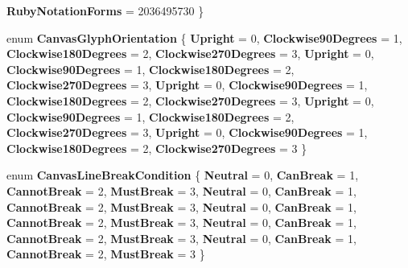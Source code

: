 \begin{DoxyCompactItemize}
{\bfseries Ruby\+Notation\+Forms} = 2036495730
 \}
\item 
\mbox{\label{namespace_microsoft_1_1_graphics_1_1_canvas_1_1_text_a6d01f61e95bc019eb180ac64876b87fe}} 
enum {\bfseries Canvas\+Glyph\+Orientation} \{ \newline
{\bfseries Upright} = 0, 
{\bfseries Clockwise90\+Degrees} = 1, 
{\bfseries Clockwise180\+Degrees} = 2, 
{\bfseries Clockwise270\+Degrees} = 3, 
\newline
{\bfseries Upright} = 0, 
{\bfseries Clockwise90\+Degrees} = 1, 
{\bfseries Clockwise180\+Degrees} = 2, 
{\bfseries Clockwise270\+Degrees} = 3, 
\newline
{\bfseries Upright} = 0, 
{\bfseries Clockwise90\+Degrees} = 1, 
{\bfseries Clockwise180\+Degrees} = 2, 
{\bfseries Clockwise270\+Degrees} = 3, 
\newline
{\bfseries Upright} = 0, 
{\bfseries Clockwise90\+Degrees} = 1, 
{\bfseries Clockwise180\+Degrees} = 2, 
{\bfseries Clockwise270\+Degrees} = 3, 
\newline
{\bfseries Upright} = 0, 
{\bfseries Clockwise90\+Degrees} = 1, 
{\bfseries Clockwise180\+Degrees} = 2, 
{\bfseries Clockwise270\+Degrees} = 3
 \}
\item 
\mbox{\label{namespace_microsoft_1_1_graphics_1_1_canvas_1_1_text_a8700477798bba01933c71dbfcf9029cd}} 
enum {\bfseries Canvas\+Line\+Break\+Condition} \{ \newline
{\bfseries Neutral} = 0, 
{\bfseries Can\+Break} = 1, 
{\bfseries Cannot\+Break} = 2, 
{\bfseries Must\+Break} = 3, 
\newline
{\bfseries Neutral} = 0, 
{\bfseries Can\+Break} = 1, 
{\bfseries Cannot\+Break} = 2, 
{\bfseries Must\+Break} = 3, 
\newline
{\bfseries Neutral} = 0, 
{\bfseries Can\+Break} = 1, 
{\bfseries Cannot\+Break} = 2, 
{\bfseries Must\+Break} = 3, 
\newline
{\bfseries Neutral} = 0, 
{\bfseries Can\+Break} = 1, 
{\bfseries Cannot\+Break} = 2, 
{\bfseries Must\+Break} = 3, 
\newline
{\bfseries Neutral} = 0, 
{\bfseries Can\+Break} = 1, 
{\bfseries Cannot\+Break} = 2, 
{\bfseries Must\+Break} = 3
 \}
\item 
\mbox{\label{namespace_microsoft_1_1_graphics_1_1_canvas_1_1_text_ad08119da3ea5d8ada9d9d9166a9516e7}} 

\end{DoxyCompactItemize}
